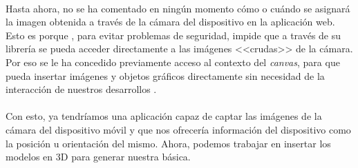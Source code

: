\documentclass{subfiles}
\begin{document}
        \paragraph{}
        Hasta ahora, no se ha comentado en ningún momento cómo o cuándo se asignará la imagen obtenida a través de la cámara del dispositivo en la aplicación web. Esto es porque \webxr, para evitar problemas de seguridad, impide que a través de su librería se pueda acceder directamente a las imágenes <<crudas>> de la cámara. Por eso se le ha concedido previamente acceso al contexto del \textit{canvas}, para que pueda insertar imágenes y objetos gráficos directamente sin necesidad de la interacción de nuestros desarrollos \cite{web:xrwebgllayer}.

        \paragraph{}
        Con esto, ya tendríamos una aplicación capaz de captar las imágenes de la cámara del dispositivo móvil y que nos ofrecería información del dispositivo como la posición u orientación del mismo. Ahora, podemos trabajar en insertar los modelos en 3D para generar nuestra \ra básica.
\end{document}
